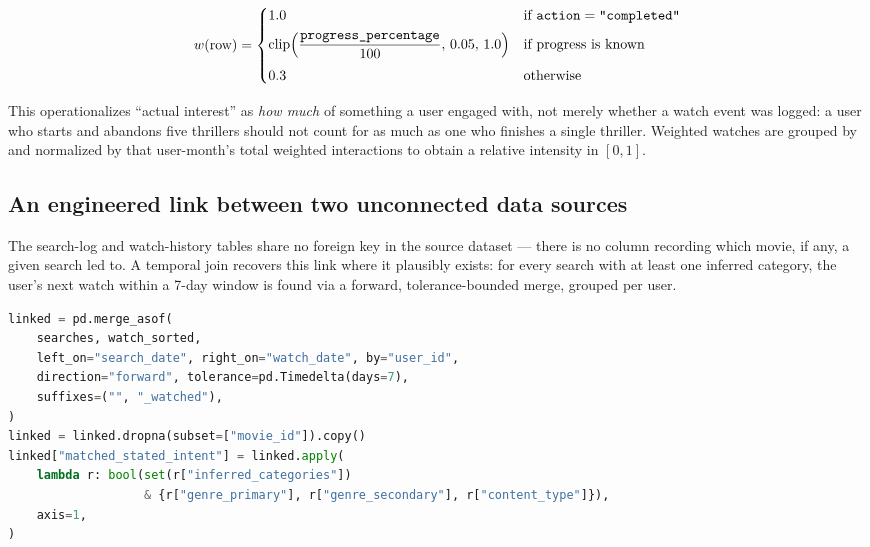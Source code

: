 \[
w(\text{row}) =
\begin{cases}
1.0 & \text{if } \texttt{action} = \texttt{"completed"} \\[4pt]
\operatorname{clip}\!\left(\dfrac{\texttt{progress\_percentage}}{100},\, 0.05,\, 1.0\right) &
    \text{if progress is known} \\[8pt]
0.3 & \text{otherwise}
\end{cases}
\]

This operationalizes ``actual interest'' as \emph{how much} of something a user engaged with, not
merely whether a watch event was logged: a user who starts and abandons five thrillers should not
count for as much as one who finishes a single thriller. Weighted watches are grouped by
 and normalized by that user-month's total weighted interactions to
obtain a relative intensity in $[0,1]$.

\subsection{An engineered link between two unconnected data sources}
\label{sec:behavior-link}

The search-log and watch-history tables share no foreign key in the source dataset --- there is no
column recording which movie, if any, a given search led to. A temporal join recovers this link
where it plausibly exists: for every search with at least one inferred category, the user's next
watch within a 7-day window is found via a forward, tolerance-bounded merge, grouped per user.

\begin{lstlisting}[language=Python, caption={The temporal join. \code{matched\_stated\_intent}
flags whether any category inferred from the search actually appears among the linked watch's own
genre/content-type --- an individually inspectable, row-level artifact of stated-vs-actual
correspondence, independent of the aggregate divergence score in Section~\ref{sec:behavior-divergence}.}]
linked = pd.merge_asof(
    searches, watch_sorted,
    left_on="search_date", right_on="watch_date", by="user_id",
    direction="forward", tolerance=pd.Timedelta(days=7),
    suffixes=("", "_watched"),
)
linked = linked.dropna(subset=["movie_id"]).copy()
linked["matched_stated_intent"] = linked.apply(
    lambda r: bool(set(r["inferred_categories"])
                   & {r["genre_primary"], r["genre_secondary"], r["content_type"]}),
    axis=1,
)
\end{lstlisting}

